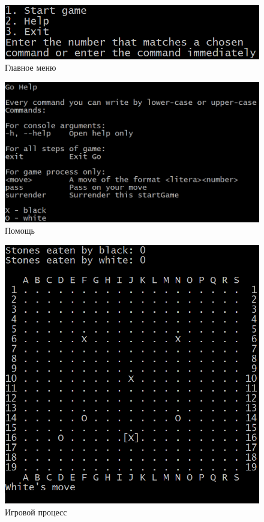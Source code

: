 \begin{figure}[H]
	\begin{center}
		\includegraphics[scale=0.6]{pics/GoCUI/Menu.png}
	    \caption{Главное меню} 
		\label{pic:CUI_Menu}
	\end{center}
\end{figure}

\begin{figure}[H]
	\begin{center}
		\includegraphics[scale=0.6]{pics/GoCUI/Help.png}
	    \caption{Помощь} 
		\label{pic:CUI_Help}
	\end{center}
\end{figure}

\begin{figure}[H]
	\begin{center}
		\includegraphics[scale=0.6]{pics/GoCUI/Process.png}
	    \caption{Игровой процесс} 
		\label{pic:CUI_Process}
	\end{center}
\end{figure}


